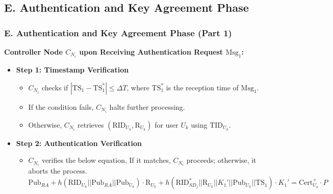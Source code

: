\documentclass[9pt,handout]{beamer}
\begin{document}
\subsection{E. Authentication and Key Agreement Phase}
\begin{frame}
    \frametitle{E. Authentication and Key Agreement Phase (Part 1)}

    \textbf{Controller Node \( C_{N_i} \) upon Receiving Authentication Request \( \text{Msg}_1 \):}

    \begin{itemize}
        \item \textbf{Step 1: Timestamp Verification}
        \begin{itemize}
            \item \( C_{N_i} \) checks if \( |\text{TS}_1 - \text{TS}^*_1| \leq \Delta T \), where \( \text{TS}^*_1 \) is the reception time of \( \text{Msg}_1 \).
            \item If the condition fails, \( C_{N_i} \) halts further processing.
            \item Otherwise, \( C_{N_i} \) retrieves \( (\text{RID}_{U_k}, \text{R}_{U_k}) \) for user \( U_k \) using \( \text{TID}_{U_k} \).
        \end{itemize}

        \item \textbf{Step 2: Authentication Verification}
        \begin{itemize}
            \item \( C_{N_i} \) verifies the below equation,  If it matches, \( C_{N_i} \) proceeds; otherwise, it aborts the process.
            \(
                \text{Pub}_{RA} + h(\text{RID}_{U_k} || \text{Pub}_{RA} || \text{Pub}_{U_k}) \cdot \text{R}_{U_k} + h(\text{RID}^*_{SD_j} || \text{R}_{U_k} || K_1' || \text{Pub}_{U_k} || \text{TS}_1) \cdot K_1' = \text{Cert}^+_{U_k} \cdot P
            \)
        \end{itemize}
    \end{itemize}

\end{frame}
\end{document}
